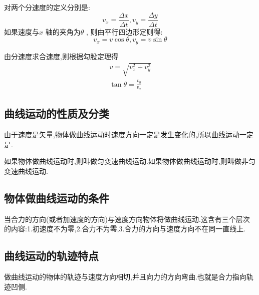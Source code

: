 对两个分速度的定义分别是:
\begin{equation}
v_x =\frac{\Delta x}{\Delta t} ,v_y =\frac{\Delta y}{\Delta t}
\end{equation}
如果速度与$x$ 轴的夹角为$\theta$ , 则由平行四边形定则得:
\begin{equation}
v_x=v\cos\theta , v_y=v\sin\theta
\end{equation}

由分速度求合速度,则根据勾股定理得
\begin{gather}
  v=\sqrt{v_x^2+v_y^2}\\
  \tan\theta=\frac{v_y}{v_x}
\end{gather}

\subsection{曲线运动的性质及分类}

由于速度是矢量,物体做曲线运动时速度方向一定是发生变化的,所以曲线运动一定是.

如果物体做曲线运动时,则叫做匀变速曲线运动.如果物体做曲线运动时,则叫做非匀变速曲线运动.

\subsection{物体做曲线运动的条件}

当合力的方向(或者加速度的方向)与速度方向物体将做曲线运动.这含有三个层次的内容:1.初速度不为零,2.合力不为零,3.合力的方向与速度方向不在同一直线上.

\subsection{曲线运动的轨迹特点}

做曲线运动的物体的轨迹与速度方向相切,并且向力的方向弯曲.也就是合力指向轨迹凹侧.

